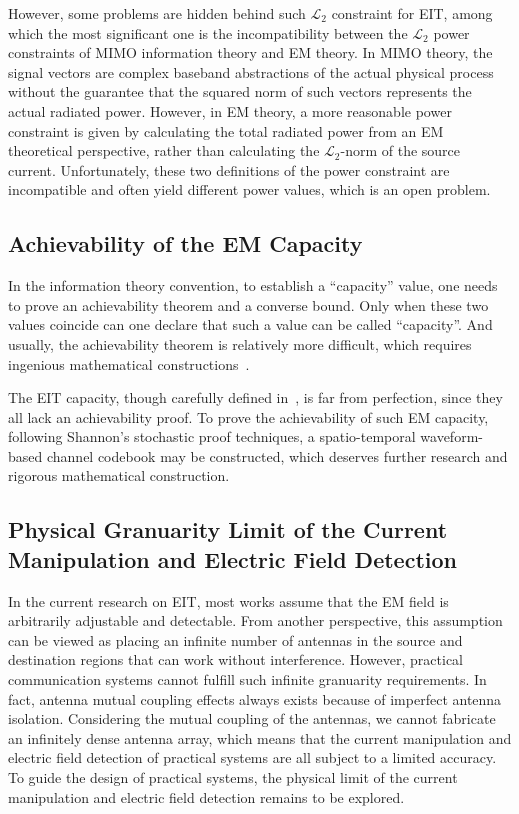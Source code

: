 \documentclass[journal,twocolumn]{IEEEtran}
\begin{document}
However, some problems are hidden behind such $\mathcal{L}_2$ constraint for EIT, among which the most significant one is the incompatibility between the $\mathcal{L}_2$ power constraints of MIMO information theory and EM theory.  
In MIMO theory, the signal vectors are complex baseband abstractions of the actual physical process without the guarantee that the squared norm of such vectors represents the actual radiated power. 
However, in EM theory, a more reasonable power constraint is given by calculating the total radiated power from an EM theoretical perspective, rather than calculating the $\mathcal{L}_2$-norm of the source current. 
Unfortunately, these two definitions of the power constraint are incompatible and often yield different power values, which is an open problem. 


\subsection{Achievability of the EM Capacity}
In the information theory convention, to establish a ``capacity'' value, one needs to prove an achievability theorem and a converse bound. Only when these two values coincide can one declare that such a value can be called ``capacity''. And usually, the achievability theorem is relatively more difficult, which requires ingenious mathematical constructions~\cite{shannon1948mathematical}. 

The EIT capacity, though carefully defined in~\cite{wan2022mutual,zhang2022pdma}, is far from perfection, since they all lack an achievability proof. 
To prove the achievability of such EM capacity, following Shannon's stochastic proof techniques, a spatio-temporal waveform-based channel codebook may be constructed, which deserves further research and rigorous mathematical construction.  

\subsection{Physical Granuarity Limit of the Current Manipulation and Electric Field Detection}
In the current research on EIT, most works assume that the EM field is arbitrarily adjustable and detectable. From another perspective, this assumption can be viewed as placing an infinite number of antennas in the source and destination regions that can work without interference. However, practical communication systems cannot fulfill such infinite granuarity requirements. In fact, antenna mutual coupling effects always exists because of imperfect antenna isolation. Considering the mutual coupling of the antennas, we cannot fabricate an infinitely dense antenna array, which means that the current manipulation and electric field detection of practical systems are all subject to a limited accuracy. To guide the design of practical systems, the physical limit of the current manipulation and electric field detection remains to be explored. 
\end{document}
